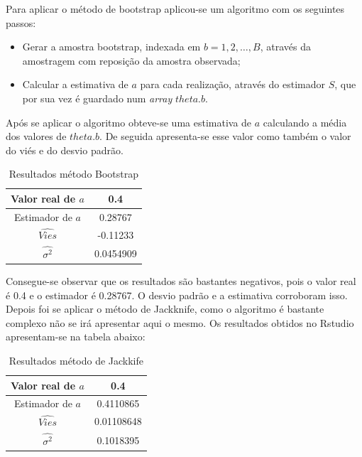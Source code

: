 \documentclass[letterpaper,11pt]{article}
\begin{document}
\begin{enumerate}
Para aplicar o método de bootstrap aplicou-se um algoritmo com os seguintes passos:
\begin{itemize}
\item Gerar a amostra bootstrap, indexada em $b=1,2,\dots , B$, através da amostragem com reposição da amostra observada;
\item Calcular a estimativa de $a$ para cada realização, através do estimador $S$, que por sua vez é guardado num \textit{array} $theta.b$. 
\end{itemize}
Após se aplicar o algoritmo obteve-se uma estimativa de $a$ calculando a média dos valores de $theta.b$. De seguida apresenta-se esse valor como também o valor do viés e do desvio padrão.\\

\begin{table}[H]
\begin{center}
\begin{tabular}{|c| c|} 
\hline
Valor real de $a$ & 0.4 \\
\hline
Estimador de $a$ & 0.28767 \\ 
\hline
$\hat{Vies}$ & -0.11233 \\
\hline
$\hat{\sigma^2}$ & 0.0454909 \\
\hline
\end{tabular}
\caption{Resultados método Bootstrap}
\end{center}
\end{table}

Consegue-se observar que os resultados são bastantes negativos, pois o valor real é 0.4 e o estimador é 0.28767. O desvio padrão e a estimativa corroboram isso.\\

 Depois foi se aplicar o método de Jackknife, como o algoritmo é bastante complexo não se irá apresentar aqui o mesmo. 
 Os resultados obtidos no Rstudio apresentam-se na tabela abaixo:
\begin{table}[H]
\begin{center}

\begin{tabular}{|c| c|} 
\hline
Valor real de $a$ & 0.4 \\
\hline
Estimador de $a$ & 0.4110865 \\ 
\hline
$\hat{Vies}$ & 0.01108648\\
\hline
$\hat{\sigma^2}$ & 0.1018395 \\
\hline
\end{tabular}
\caption{Resultados método de Jackkife}
\end{center}
\end{table}


\end{enumerate}
\end{document}
